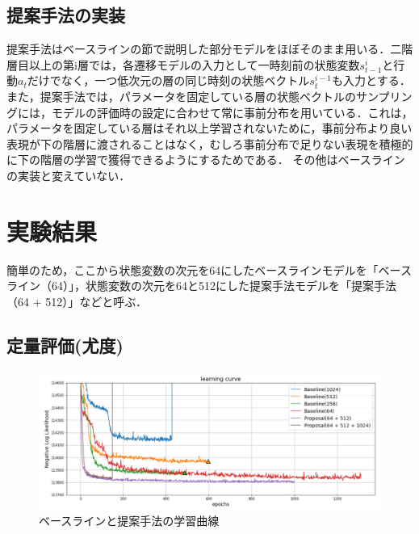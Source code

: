 \subsection{提案手法の実装}
提案手法はベースラインの節で説明した部分モデルをほぼそのまま用いる．二階層目以上の第i層では，各遷移モデルの入力として一時刻前の状態変数$s^i_{t-1}$と行動$a_t$だけでなく，一つ低次元の層の同じ時刻の状態ベクトル$s^{i-1}_t$も入力とする．また，提案手法では，パラメータを固定している層の状態ベクトルのサンプリングには，モデルの評価時の設定に合わせて常に事前分布を用いている．これは，パラメータを固定している層はそれ以上学習されないために，事前分布より良い表現が下の階層に渡されることはなく，むしろ事前分布で足りない表現を積極的に下の階層の学習で獲得できるようにするためである．
その他はベースラインの実装と変えていない．


\section{実験結果}

簡単のため，ここから状態変数の次元を64にしたベースラインモデルを「ベースライン（64）」，状態変数の次元を64と512にした提案手法モデルを「提案手法（64 + 512）」などと呼ぶ．

\subsection{定量評価(尤度)}

\begin{figure}[tp]
    \begin{center}
        \includegraphics[width=\linewidth]{./figures/curve.png}
        \caption[提案手法の学習曲線]{ベースラインと提案手法の学習曲線}
        \label{fig:curve}
    \end{center}
    \end{figure}

